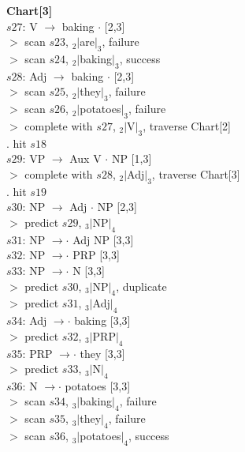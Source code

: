 \documentclass[twoside,11pt]{homework}
\begin{document}
\begin{solution}
  \textbf{Chart[3]}\\
  $s27$: V $\rightarrow$ baking $\cdot$ [2,3]\\
  $>$ scan $s23$, $_2|$are$|_3$, failure\\
  $>$ scan $s24$, $_2|$baking$|_3$, success\\
  $s28$: Adj $\rightarrow$ baking $\cdot$ [2,3]\\
  $>$ scan $s25$, $_2|$they$|_3$, failure\\
  $>$ scan $s26$, $_2|$potatoes$|_3$, failure\\
  $>$ complete with $s27$, $_2|$V$|_3$, traverse Chart[2]\\
  $.$ hit $s18$\\
  $s29$: VP $\rightarrow$ Aux V $\cdot$ NP [1,3]\\
  $>$ complete with $s28$, $_2|$Adj$|_3$, traverse Chart[3]\\
  $.$ hit $s19$\\
  $s30$: NP $\rightarrow$ Adj $\cdot$ NP [2,3]\\
  $>$ predict $s29$, $_3|$NP$|_4$\\
  $s31$: NP $\rightarrow \cdot$ Adj NP [3,3]\\
  $s32$: NP $\rightarrow \cdot$ PRP [3,3]\\
  $s33$: NP $\rightarrow \cdot$ N [3,3]\\
  $>$ predict $s30$, $_3|$NP$|_4$, duplicate\\
  $>$ predict $s31$, $_3|$Adj$|_4$\\
  $s34$: Adj $\rightarrow \cdot$ baking [3,3]\\
  $>$ predict $s32$, $_3|$PRP$|_4$\\
  $s35$: PRP $\rightarrow \cdot$ they [3,3]\\
  $>$ predict $s33$, $_3|$N$|_4$\\
  $s36$: N $\rightarrow \cdot$ potatoes [3,3]\\
  $>$ scan $s34$, $_3|$baking$|_4$, failure\\
  $>$ scan $s35$, $_3|$they$|_4$, failure\\
  $>$ scan $s36$, $_3|$potatoes$|_4$, success\\


\end{solution}
\end{document}
